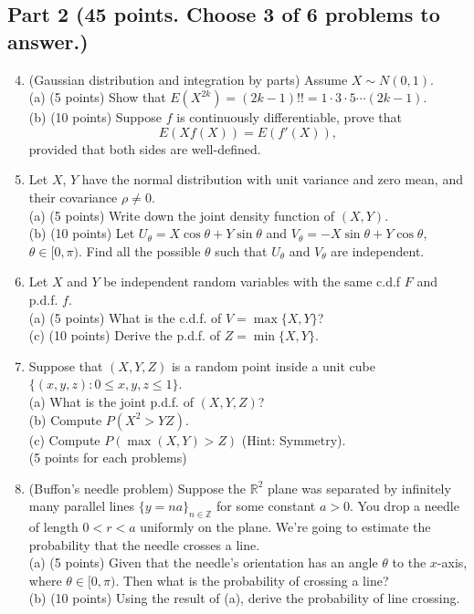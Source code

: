 \documentclass[14pt]{extarticle}
\begin{document}
\subsection*{Part 2 (45 points. Choose 3 of 6 problems to answer.)}
\begin{enumerate}
\setcounter{enumi}{3}

	\item (Gaussian distribution and integration by parts) Assume $X\sim N(0,1)$.\\
	(a) (5 points) Show that $E(X^{2k})=(2k-1)!!=1\cdot 3\cdot 5\cdots (2k-1)$.\\
	(b) (10 points) Suppose $f$ is continuously differentiable, prove that
	\begin{equation*}
	E(Xf(X))=E(f'(X)),
	\end{equation*}
	provided that both sides are well-defined.

    \item Let $X$, $Y$ have the normal distribution with unit variance and zero mean, and their covariance $\rho\neq 0$.\\
    (a) (5 points) Write down the joint density function of $(X,Y)$.\\
    (b) (10 points) Let $U_\theta=X\cos\theta+Y\sin\theta$ and $V_\theta=-X\sin\theta+Y\cos\theta$, $\theta\in[0,\pi)$. Find all the possible $\theta$ such that $U_\theta$ and $V_\theta$ are independent.
    
    \item Let $X$ and $Y$ be independent random variables with the same c.d.f $F$ and p.d.f. $f$.\\
    (a) (5 points) What is the c.d.f. of $V=\max\{X,Y\}$?\\
    (c) (10 points) Derive the p.d.f. of $Z=\min\{X,Y\}$.
    
    \item Suppose that $(X,Y,Z)$ is a random point inside a unit cube $\{(x,y,z):0\leq x,y,z\leq 1\}$.\\
    (a) What is the joint p.d.f. of $(X,Y,Z)$?\\
    (b) Compute $P(X^2>YZ)$.\\
    (c) Compute $P(\max(X,Y)>Z)$ (Hint: Symmetry).\\
    (5 points for each problems)
    
    \item (Buffon's needle problem) Suppose the $\mathbb{R}^2$ plane was separated by infinitely many parallel lines $\{y=na\}_{n\in\mathbb{Z}}$ for some constant $a>0$. You drop a needle of length $0<r<a$ uniformly on the plane. We're going to estimate the probability that the needle crosses a line.\\
    (a) (5 points) Given that the needle's orientation has an angle $\theta$ to the $x$-axis, where $\theta\in[0,\pi)$. Then what is the probability of crossing a line?\\
    (b) (10 points) Using the result of (a), derive the probability of line crossing.
    

\end{enumerate}
\end{document}
